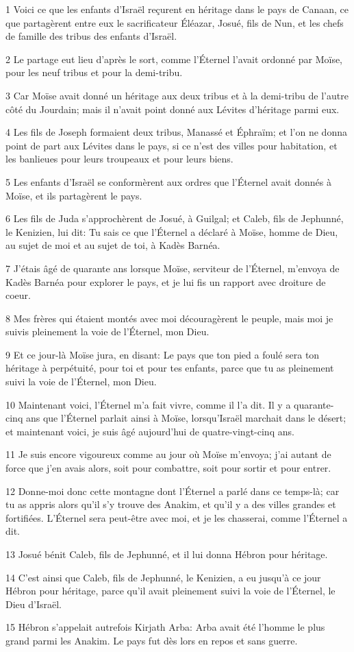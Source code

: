 \par 1 Voici ce que les enfants d'Israël reçurent en héritage dans le pays de Canaan, ce que partagèrent entre eux le sacrificateur Éléazar, Josué, fils de Nun, et les chefs de famille des tribus des enfants d'Israël.
\par 2 Le partage eut lieu d'après le sort, comme l'Éternel l'avait ordonné par Moïse, pour les neuf tribus et pour la demi-tribu.
\par 3 Car Moïse avait donné un héritage aux deux tribus et à la demi-tribu de l'autre côté du Jourdain; mais il n'avait point donné aux Lévites d'héritage parmi eux.
\par 4 Les fils de Joseph formaient deux tribus, Manassé et Éphraïm; et l'on ne donna point de part aux Lévites dans le pays, si ce n'est des villes pour habitation, et les banlieues pour leurs troupeaux et pour leurs biens.
\par 5 Les enfants d'Israël se conformèrent aux ordres que l'Éternel avait donnés à Moïse, et ils partagèrent le pays.
\par 6 Les fils de Juda s'approchèrent de Josué, à Guilgal; et Caleb, fils de Jephunné, le Kenizien, lui dit: Tu sais ce que l'Éternel a déclaré à Moïse, homme de Dieu, au sujet de moi et au sujet de toi, à Kadès Barnéa.
\par 7 J'étais âgé de quarante ans lorsque Moïse, serviteur de l'Éternel, m'envoya de Kadès Barnéa pour explorer le pays, et je lui fis un rapport avec droiture de coeur.
\par 8 Mes frères qui étaient montés avec moi découragèrent le peuple, mais moi je suivis pleinement la voie de l'Éternel, mon Dieu.
\par 9 Et ce jour-là Moïse jura, en disant: Le pays que ton pied a foulé sera ton héritage à perpétuité, pour toi et pour tes enfants, parce que tu as pleinement suivi la voie de l'Éternel, mon Dieu.
\par 10 Maintenant voici, l'Éternel m'a fait vivre, comme il l'a dit. Il y a quarante-cinq ans que l'Éternel parlait ainsi à Moïse, lorsqu'Israël marchait dans le désert; et maintenant voici, je suis âgé aujourd'hui de quatre-vingt-cinq ans.
\par 11 Je suis encore vigoureux comme au jour où Moïse m'envoya; j'ai autant de force que j'en avais alors, soit pour combattre, soit pour sortir et pour entrer.
\par 12 Donne-moi donc cette montagne dont l'Éternel a parlé dans ce temps-là; car tu as appris alors qu'il s'y trouve des Anakim, et qu'il y a des villes grandes et fortifiées. L'Éternel sera peut-être avec moi, et je les chasserai, comme l'Éternel a dit.
\par 13 Josué bénit Caleb, fils de Jephunné, et il lui donna Hébron pour héritage.
\par 14 C'est ainsi que Caleb, fils de Jephunné, le Kenizien, a eu jusqu'à ce jour Hébron pour héritage, parce qu'il avait pleinement suivi la voie de l'Éternel, le Dieu d'Israël.
\par 15 Hébron s'appelait autrefois Kirjath Arba: Arba avait été l'homme le plus grand parmi les Anakim. Le pays fut dès lors en repos et sans guerre.

